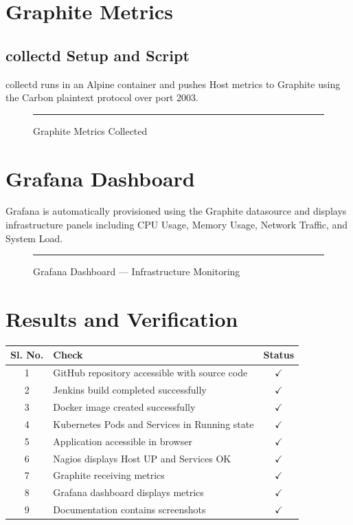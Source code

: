 \documentclass[12pt, a4paper]{article}
\begin{document}
\section{Graphite Metrics}
\subsection{collectd Setup and Script}
collectd runs in an Alpine container and pushes Host metrics to Graphite using the Carbon plaintext protocol over port 2003.

\begin{figure}[H]
    \centering
    \rule{\textwidth}{6cm}
    \caption{Graphite Metrics Collected}
    \label{fig:graphite_dashboard}
\end{figure}

\newpage

\section{Grafana Dashboard}
Grafana is automatically provisioned using the Graphite datasource and displays infrastructure panels including CPU Usage, Memory Usage, Network Traffic, and System Load.

\begin{figure}[H]
    \centering
    \rule{\textwidth}{8cm}
    \caption{Grafana Dashboard --- Infrastructure Monitoring}
    \label{fig:grafana_dashboard}
\end{figure}

\section{Results and Verification}
\begin{table}[H]
\centering
\begin{tabular}{|c|l|c|}
\hline
\textbf{Sl. No.} & \textbf{Check} & \textbf{Status} \\ \hline
1 & GitHub repository accessible with source code & $\checkmark$ \\ \hline
2 & Jenkins build completed successfully & $\checkmark$ \\ \hline
3 & Docker image created successfully & $\checkmark$ \\ \hline
4 & Kubernetes Pods and Services in Running state & $\checkmark$ \\ \hline
5 & Application accessible in browser & $\checkmark$ \\ \hline
6 & Nagios displays Host UP and Services OK & $\checkmark$ \\ \hline
7 & Graphite receiving metrics & $\checkmark$ \\ \hline
8 & Grafana dashboard displays metrics & $\checkmark$ \\ \hline
9 & Documentation contains screenshots & $\checkmark$ \\ \hline
\end{tabular}
\end{table}
\end{document}
